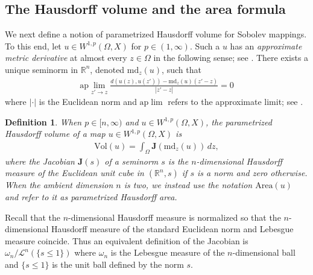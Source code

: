 \documentclass[a4paper,leqno]{amsart}
\numberwithin{equation}{section}
\newtheorem{definition}[theorem]{Definition}
\theoremstyle{remark}
\theoremstyle{remark}
\newcommand{\lm}{\mathscr{L}}
\begin{document}
\subsection{The Hausdorff volume and the area formula}\label{section-parametrized-volume}
We next define a notion of parametrized Hausdorff volume for Sobolev mappings. To this end, let $u \in W^{1,p}( \Omega, X )$ for $p \in (1,\infty)$. Such a $u$ has an \emph{approximate metric derivative} at almost every $z \in \Omega$ in the following sense; see \cite{Karm:07,Lyt:Wen:17:areamini}. There exists a unique seminorm in $\mathbb{R}^n$, denoted $\mathrm{md}_z(u)$, such that
\begin{align*}
    \mathrm{ap}\lim_{ z ' \rightarrow z }
    \frac{ d( u(z), u(z') ) - \mathrm{md}_z(u)( z'-z ) }{ |z'-z| }
    =
    0
\end{align*}
where $| \cdot|$ is the Euclidean norm and $\mathrm{ap}\lim$ refers to the approximate limit; see \cite[2.9.11]{Fed:69}. 
\begin{definition}\label{def:parametrizedvolume}
When $p \in [n,\infty)$ and $u \in W^{1,p}( \Omega, X )$, the parametrized Hausdorff volume of a map $u \in W^{1,p}( \Omega, X)$ is
\begin{align*}
    \mathrm{Vol}( u ) = \int_{ \Omega } \mathbf{J}( \mathrm{md}_z(u)) \,dz,
\end{align*}
where the Jacobian $\mathbf{J}(s)$ of a seminorm $s$ is the $n$-dimensional Hausdorff measure of the Euclidean unit cube in $( \mathbb{R}^n, s )$ if $s$ is a norm and zero otherwise. When the ambient dimension $n$ is two, we instead use the notation $\mathrm{Area}(u)$ and refer to it as parametrized Hausdorff area.
\end{definition}
Recall that the $n$-dimensional Hausdorff measure is normalized so that the $n$-dimensional Hausdorff measure of the standard Euclidean norm and Lebesgue measure coincide. Thus an equivalent definition of the Jacobian is $\omega_n/ \lm^{n}( \{ s \leq 1 \} )$ where $\omega_n$ is the Lebesgue measure of the $n$-dimensional ball and $\{ s \leq 1 \}$ is the unit ball defined by the norm $s$.
\end{document}
